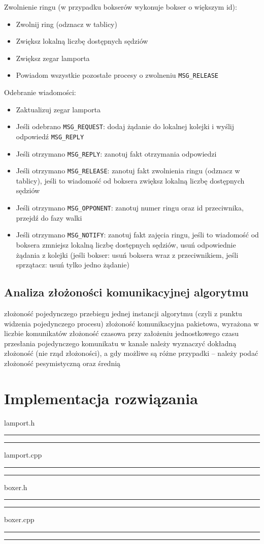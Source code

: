 \documentclass{article}
\begin{document}
Zwolnienie ringu (w przypadku bokserów wykonuje bokser o większym id):
\begin{itemize}
    \item Zwolnij ring (odznacz w tablicy)
    \item Zwiększ lokalną liczbę dostępnych sędziów
    \item Zwiększ zegar lamporta
    \item Powiadom wszystkie pozostałe procesy o zwolneniu \verb|MSG_RELEASE|
\end{itemize}

Odebranie wiadomości:
\begin{itemize}
    \item Zaktualizuj zegar lamporta
    \item Jeśli odebrano \verb|MSG_REQUEST|: dodaj żądanie do lokalnej
    kolejki i  wyślij odpowiedź \verb|MSG_REPLY|
    \item Jeśli otrzymano \verb|MSG_REPLY|: zanotuj fakt otrzymania
    odpowiedzi
    \item Jeśli otrzymano \verb|MSG_RELEASE|: zanotuj fakt zwolnienia
    ringu (odznacz w tablicy), jeśli to wiadomość od boksera zwiększ
    lokalną liczbę dostępnych sędziów
    \item Jeśli otrzymano \verb|MSG_OPPONENT|: zanotuj numer ringu oraz
    id przeciwnika, przejdź do fazy walki
    \item Jeśli otrzymano \verb|MSG_NOTIFY|: zanotuj fakt zajęcia ringu,
    jeśli to wiadomość od boksera zmniejsz lokalną liczbę dostępnych
    sędziów, usuń odpowiednie żądania z kolejki (jeśli bokser: usuń
    boksera wraz z przeciwnikiem, jeśli sprzątacz: usuń tylko jedno
    żądanie)
\end{itemize}


\subsection{Analiza złożoności komunikacyjnej algorytmu}
złożoność pojedynczego przebiegu jednej instancji algorytmu (czyli z punktu widzenia pojedynczego procesu) 
złożoność komunikacyjna pakietowa, wyrażona w liczbie komunikatów
złożoność czasowa przy założeniu jednostkowego czasu przesłania pojedynczego komunikatu w kanale
należy wyznaczyć dokładną złożoność (nie rząd złożoności), a gdy możliwe są różne przypadki – należy podać złożoność pesymistyczną oraz średnią

\section{Implementacja rozwiązania}
lamport.h
\hrule

\hrule
lamport.cpp
\hrule

\hrule
boxer.h
\hrule

\hrule
boxer.cpp
\hrule

\hrule
\end{document}
